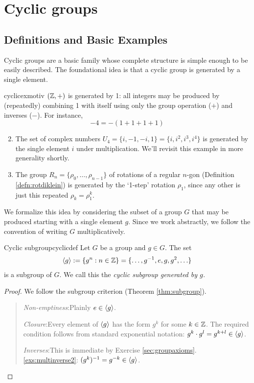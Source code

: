 \graphicspath{{3cyclic/asy/}}

\section{Cyclic groups}\label{chap:cyclic}

\subsection{Definitions and Basic Examples}\label{sec:cycdef}

Cyclic groups are a basic family whose complete structure is simple enough to be easily described. The foundational idea is that a cyclic group is generated by a single element.

\begin{examples}{}{cyclicexmotiv}
	\exstart $(\mathbb{Z},+)$ is generated by 1: all integers may be produced by (repeatedly) combining 1 with itself using only the group operation ($+$) and inverses ($-$). For instance,
	  \[
	  	-4=-(1+1+1+1)
	  \]
	\begin{enumerate}\setcounter{enumi}{1}
	   \item The set of complex numbers $U_4=\{i,-1,-i,1\}=\{i,i^2,i^3,i^4\}$ is generated by the single element $i$ under multiplication. We'll revisit this example in more generality shortly.
	 	\item The group $R_n=\{\rho_0,\ldots,\rho_{n-1}\}$ of rotations of a regular $n$-gon (Definition \ref{defn:rotdiklein}) is generated by the `1-step' rotation $\rho_1$, since any other is just this repeated $\rho_k=\rho_1^k$.
	\end{enumerate}
\end{examples}

We formalize this idea by considering the subset of a group $G$ that may be produced starting with a single element $g$. Since we work abstractly, we follow the convention of writing $G$ multiplicatively.

\begin{lemm}{Cyclic subgroup}{cyclicdef}
	Let $G$ be a group and $g\in G$. The set
	\[
		\left\langle g\right\rangle:=\{g^n:n\in\mathbb{Z}\}=\{\ldots,g^{-1},e,g,g^2,\ldots\}
	\]
	is a subgroup of $G$. We call this the \emph{cyclic subgroup generated by $g$.}
\end{lemm}

\begin{proof}
	We follow the subgroup criterion (Theorem \ref{thm:subgroup}).
	\begin{quote}
		\emph{Non-emptiness}:\quad Plainly $e\in\left\langle g\right\rangle$.\par
		\emph{Closure}:\quad Every element of $\left\langle g\right\rangle$ has the form $g^k$ for some $k\in \mathbb{Z}$. The required condition follows from standard exponential notation: $g^k\cdot g^l=g^{k+l}\in\left\langle g\right\rangle$.\par
		\emph{Inverses}:\quad This is immediate by Exercise \ref*{sec:groupaxioms}.\ref{exs:multinverse2}: $(g^k)^{-1}=g^{-k}\in\left\langle g\right\rangle$.\qedhere
	\end{quote}
\end{proof}

